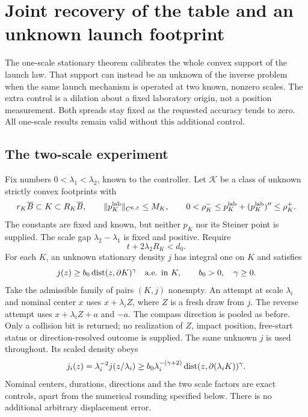 \section{Joint recovery of the table and an unknown launch footprint}
\label{sec:unknown-footprint}
The one-scale stationary theorem calibrates the whole convex support of
the launch law. That support can instead be an unknown of the inverse
problem when the same launch mechanism is operated at two known,
nonzero scales. The extra control is a dilation about a fixed laboratory
origin, not a position measurement. Both spreads stay fixed as the
requested accuracy tends to zero. All one-scale results remain valid
without this additional control.

\subsection{The two-scale experiment}
Fix numbers $0<\lambda_1<\lambda_2$, known to the controller. Let
$\mathcal K$ be a class of unknown strictly convex footprints with
\begin{equation}\label{eq:unknown-K-prior}
 r_K\overline B\subset K\subset R_K\overline B,\qquad
 \|p_K^{\rm lab}\|_{C^{6,\beta}}\le M_K,\qquad
 0<\rho_K^-\le p_K^{\rm lab}+(p_K^{\rm lab})''\le\rho_K^+.
\end{equation}
The constants are fixed and known, but neither $p_K$ nor its Steiner
point is supplied. The scale gap $\lambda_2-\lambda_1$ is fixed and
positive. Require
\begin{equation}\label{eq:unknown-K-separation}
                      t+2\lambda_2R_K<d_0.
\end{equation}
For each $K$, an unknown stationary density $j$ has integral one on
$K$ and satisfies
\begin{equation}\label{eq:unknown-K-density}
 j(z)\ge b_0\operatorname{dist}(z,\partial K)^\gamma\quad\text{a.e. in }K,
               \qquad b_0>0,\quad \gamma\ge0.
\end{equation}
Take the admissible family of pairs $(K,j)$ nonempty. An attempt at
scale $\lambda_i$ and nominal center $x$ uses $x+\lambda_i Z$,
where $Z$ is a fresh draw from $j$. The reverse attempt uses
$x+\lambda_i Z+a$ and $-a$. The compass direction is pooled as
before. Only a collision bit is returned; no realization of $Z$, impact
position, free-start status or direction-resolved outcome is supplied.
The same unknown $j$ is used throughout. Its scaled density obeys
\begin{equation}\label{eq:scaled-density-bound}
 j_i(z)=\lambda_i^{-2}j(z/\lambda_i)
 \ge b_0\lambda_i^{-(\gamma+2)}
                    \operatorname{dist}(z,\partial(\lambda_iK))^\gamma.
\end{equation}
Nominal centers, durations, directions and the two scale factors are
exact controls, apart from the numerical rounding specified below.
There is no additional arbitrary displacement error.

